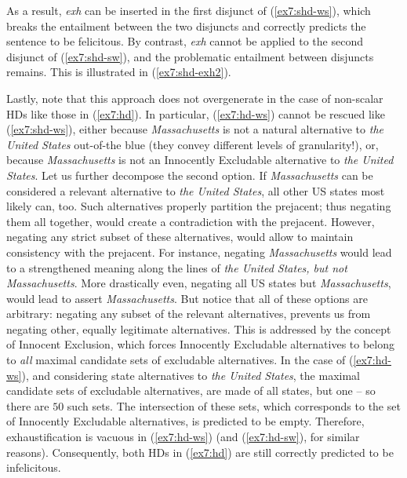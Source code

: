 As a result, \textit{exh} can be inserted in the first disjunct of (\ref{ex7:shd-ws}), which breaks the entailment between the two disjuncts and correctly predicts the sentence to be felicitous. By contrast, \textit{exh} cannot be applied to the second disjunct of (\ref{ex7:shd-sw}), and the problematic entailment between disjuncts remains. This is illustrated in (\ref{ex7:shd-exh2}).


\begin{exe}
	\ex\label{ex7:shd-exh2}
	\begin{xlist}
		\label{ex7:shd-ws-exh2}
		\label{ex7:shd-sw-exh2}
	\end{xlist}
\end{exe}


Lastly, note that this approach does not overgenerate in the case of non-scalar HDs like those in (\ref{ex7:hd}). In particular, (\ref{ex7:hd-ws}) cannot be rescued like (\ref{ex7:shd-ws}), either because \textit{Massachusetts} is not a natural alternative to \textit{the United States} out-of-the blue (they convey different levels of granularity!), or, because \textit{Massachusetts} is not an Innocently Excludable alternative to \textit{the United States}. Let us further decompose the second option. If \textit{Massachusetts} can be considered a relevant alternative to \textit{the United States}, all other US states most likely can, too. Such alternatives properly partition the prejacent; thus negating them all together, would create a contradiction with the prejacent. However, negating any strict subset of these alternatives, would allow to maintain consistency with the prejacent. For instance, negating \textit{Massachusetts} would lead to a strengthened meaning along the lines of \textit{the United States, but not Massachusetts}. More drastically even, negating all US states but \textit{Massachusetts}, would lead to assert \textit{Massachusetts}. But notice that all of these options are arbitrary: negating any subset of the relevant alternatives, prevents us from negating other, equally legitimate alternatives. This is addressed by the concept of Innocent Exclusion, which forces Innocently Excludable alternatives to belong to \textit{all} maximal candidate sets of excludable alternatives. In the case of (\ref{ex7:hd-ws}), and considering state alternatives to \textit{the United States}, the maximal candidate sets of excludable alternatives, are made of all states, but one -- so there are $50$ such sets. The intersection of these sets, which corresponds to the set of Innocently Excludable alternatives, is predicted to be empty. Therefore, exhaustification is vacuous in (\ref{ex7:hd-ws}) (and (\ref{ex7:hd-sw}), for similar reasons). Consequently, both HDs in (\ref{ex7:hd}) are still correctly predicted to be infelicitous.\\

